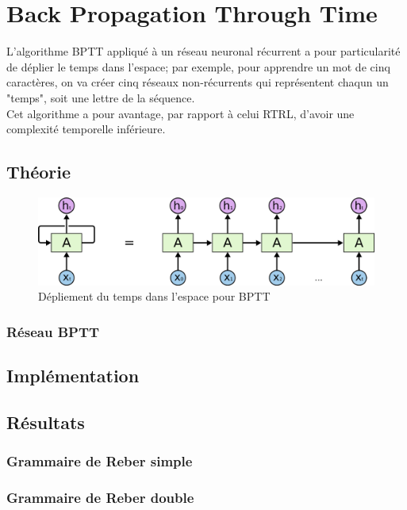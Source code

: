 
\chapter{Back Propagation Through Time}
L'algorithme BPTT appliqué à un réseau neuronal récurrent a pour particularité
de déplier le temps dans l'espace; par exemple, pour apprendre un mot de cinq
caractères, on va créer cinq réseaux non-récurrents qui représentent chaqun un
"temps", soit une lettre de la séquence. \\

Cet algorithme a pour avantage, par rapport à celui RTRL, d'avoir une
complexité temporelle inférieure.

\section{Théorie}

\begin{figure}[!ht]
\begin{center}
\includegraphics[scale=0.2]{images/bptt.png}
\end{center}
\caption{Dépliement du temps dans l'espace pour BPTT}
\end{figure}

\subsection{Réseau BPTT}

\section{Implémentation}

\section{Résultats}
\subsection{Grammaire de Reber simple}
\subsection{Grammaire de Reber double}
